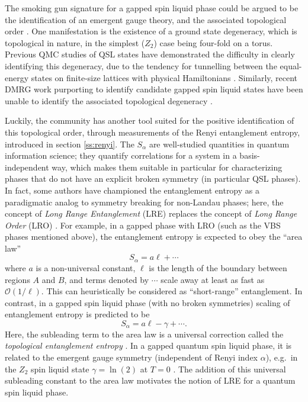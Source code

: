 \documentclass[range]{ar2e}
\begin{document}
The smoking gun signature for a gapped spin liquid phase could be argued to be the identification of an emergent gauge theory,
and the associated topological order \cite{Wenbook}.  One manifestation is the existence of a ground state degeneracy, which is topological in nature, in the simplest ($Z_2$) case being four-fold on a torus.  Previous QMC studies of QSL states have demonstrated the difficulty in clearly identifying this degeneracy, due to the tendency for tunnelling between the equal-energy states on finite-size lattices with physical Hamiltonians \cite{Isakov1}.  Similarly, recent DMRG work purporting to identify candidate gapped spin liquid states have been unable to identify the associated topological degeneracy \cite{Yan,J1J2}.

Luckily, the community has another tool suited for the positive identification of this topological order, through measurements of the Renyi entanglement entropy, introduced in section \ref{ss:renyi}.  The $S_{\alpha}$ are well-studied quantities in quantum information science; they quantify correlations for a system in a basis-independent way, which makes them suitable in particular for characterizing phases that do not have an explicit broken symmetry (in particular QSL phases).  In fact, some authors have championed the entanglement entropy as a paradigmatic analog to symmetry breaking for non-Landau phases; here, the concept of {\it Long Range Entanglement} (LRE) replaces the concept of {\it Long Range Order} (LRO) \cite{Wenbook}.  For example, in a gapped phase with LRO (such as the VBS phases mentioned above),
the entanglement entropy is expected to obey the ``area law''
\begin{equation} 
S_{\alpha} = a\ell + \cdots \label{arealaw}
\end{equation}
where $a$ is a non-universal constant, $\ell$ is the length of the boundary between regions $A$ and $B$, and terms denoted by $\cdots$ scale away at least as fast as $\mathcal{O} (1/\ell)$.  This can heuristically be considered as ``short-range'' entanglement.  In contrast, in a gapped spin liquid phase (with no broken symmetries)
scaling of entanglement entropy is predicted to be
\begin{equation}
S_{\alpha} = a \ell - \gamma + \cdots \label{areaL}.
\end{equation}
 Here, the subleading term to the area law is a universal correction called the {\it topological entanglement entropy} \cite{Alioscia1,Alioscia2,LW,KP}.  In a gapped quantum spin liquid phase, it is related to the emergent gauge symmetry (independent \cite{Flammia} of Renyi index $\alpha$), e.g.~in the $Z_2$ spin liquid state $\gamma =  \ln(2)$ at $T=0$ \cite{LW}.   The addition of this universal subleading constant to the area law motivates the notion of LRE for a quantum spin liquid phase.
\end{document}
